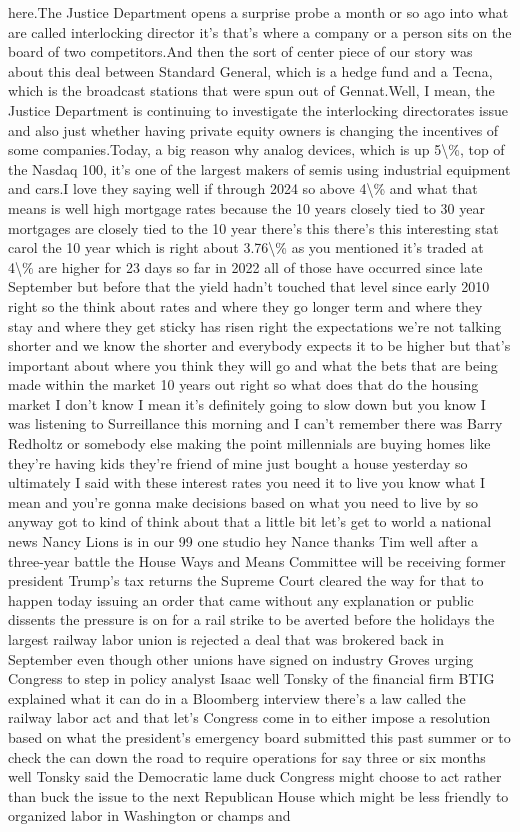 \documentclass{article}%
\begin{document}
here.The Justice Department opens a surprise probe a month or so ago into what are called interlocking director it's that's where a company or a person sits on the board of two competitors.And then the sort of center piece of our story was about this deal between Standard General, which is a hedge fund and a Tecna, which is the broadcast stations that were spun out of Gennat.Well, I mean, the Justice Department is continuing to investigate the interlocking directorates issue and also just whether having private equity owners is changing the incentives of some companies.Today, a big reason why analog devices, which is up 5\textbackslash{}\%, top of the Nasdaq 100, it's one of the largest makers of semis using industrial equipment and cars.I love they saying well if through 2024 so above 4\textbackslash{}\% and what that means is well high mortgage rates because the 10 years closely tied to 30 year mortgages are closely tied to the 10 year there's this there's this interesting stat carol the 10 year which is right about 3.76\textbackslash{}\% as you mentioned it's traded at 4\textbackslash{}\% are higher for 23 days so far in 2022 all of those have occurred since late September but before that the yield hadn't touched that level since early 2010 right so the think about rates and where they go longer term and where they stay and where they get sticky has risen right the expectations we're not talking shorter and we know the shorter and everybody expects it to be higher but that's important about where you think they will go and what the bets that are being made within the market 10 years out right so what does that do the housing market I don't know I mean it's definitely going to slow down but you know I was listening to Surreillance this morning and I can't remember there was Barry Redholtz or somebody else making the point millennials are buying homes like they're having kids they're friend of mine just bought a house yesterday so ultimately I said with these interest rates you need it to live you know what I mean and you're gonna make decisions based on what you need to live by so anyway got to kind of think about that a little bit let's get to world a national news Nancy Lions is in our 99 one studio hey Nance thanks Tim well after a three{-}year battle the House Ways and Means Committee will be receiving former president Trump's tax returns the Supreme Court cleared the way for that to happen today issuing an order that came without any explanation or public dissents the pressure is on for a rail strike to be averted before the holidays the largest railway labor union is rejected a deal that was brokered back in September even though other unions have signed on industry Groves urging Congress to step in policy analyst Isaac well Tonsky of the financial firm BTIG explained what it can do in a Bloomberg interview there's a law called the railway labor act and that let's Congress come in to either impose a resolution based on what the president's emergency board submitted this past summer or to check the can down the road to require operations for say three or six months well Tonsky said the Democratic lame duck Congress might choose to act rather than buck the issue to the next Republican House which might be less friendly to organized labor in Washington or champs and 
\end{document}
